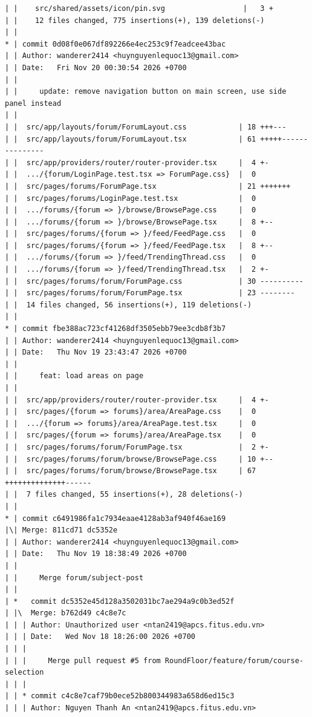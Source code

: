 \documentclass[12pt]{article}
\begin{document}
\begin{lstlisting}[numbers=none,breaklines=true]
| |    src/shared/assets/icon/pin.svg                  |   3 +
| |    12 files changed, 775 insertions(+), 139 deletions(-)
| |
* | commit 0d08f0e067df892266e4ec253c9f7eadcee43bac
| | Author: wanderer2414 <huynguyenlequoc13@gmail.com>
| | Date:   Fri Nov 20 00:30:54 2026 +0700
| |
| |     update: remove navigation button on main screen, use side panel instead
| |
| |  src/app/layouts/forum/ForumLayout.css            | 18 +++---
| |  src/app/layouts/forum/ForumLayout.tsx            | 61 +++++---------------
| |  src/app/providers/router/router-provider.tsx     |  4 +-
| |  .../{forum/LoginPage.test.tsx => ForumPage.css}  |  0
| |  src/pages/forums/ForumPage.tsx                   | 21 +++++++
| |  src/pages/forums/LoginPage.test.tsx              |  0
| |  .../forums/{forum => }/browse/BrowsePage.css     |  0
| |  .../forums/{forum => }/browse/BrowsePage.tsx     |  8 +--
| |  src/pages/forums/{forum => }/feed/FeedPage.css   |  0
| |  src/pages/forums/{forum => }/feed/FeedPage.tsx   |  8 +--
| |  .../forums/{forum => }/feed/TrendingThread.css   |  0
| |  .../forums/{forum => }/feed/TrendingThread.tsx   |  2 +-
| |  src/pages/forums/forum/ForumPage.css             | 30 ----------
| |  src/pages/forums/forum/ForumPage.tsx             | 23 --------
| |  14 files changed, 56 insertions(+), 119 deletions(-)
| |
* | commit fbe388ac723cf41268df3505ebb79ee3cdb8f3b7
| | Author: wanderer2414 <huynguyenlequoc13@gmail.com>
| | Date:   Thu Nov 19 23:43:47 2026 +0700
| |
| |     feat: load areas on page
| |
| |  src/app/providers/router/router-provider.tsx     |  4 +-
| |  src/pages/{forum => forums}/area/AreaPage.css    |  0
| |  .../{forum => forums}/area/AreaPage.test.tsx     |  0
| |  src/pages/{forum => forums}/area/AreaPage.tsx    |  0
| |  src/pages/forums/forum/ForumPage.tsx             |  2 +-
| |  src/pages/forums/forum/browse/BrowsePage.css     | 10 +--
| |  src/pages/forums/forum/browse/BrowsePage.tsx     | 67 ++++++++++++++------
| |  7 files changed, 55 insertions(+), 28 deletions(-)
| |
* | commit c6491986fa1c7934eaae4128ab3af940f46ae169
|\| Merge: 811cd71 dc5352e
| | Author: wanderer2414 <huynguyenlequoc13@gmail.com>
| | Date:   Thu Nov 19 18:38:49 2026 +0700
| |
| |     Merge forum/subject-post
| |
| *   commit dc5352e45d128a3502031bc7ae294a9c0b3ed52f
| |\  Merge: b762d49 c4c8e7c
| | | Author: Unauthorized user <ntan2419@apcs.fitus.edu.vn>
| | | Date:   Wed Nov 18 18:26:00 2026 +0700
| | |
| | |     Merge pull request #5 from RoundFloor/feature/forum/course-selection
| | |
| | * commit c4c8e7caf79b0ece52b800344983a658d6ed15c3
| | | Author: Nguyen Thanh An <ntan2419@apcs.fitus.edu.vn>

\end{lstlisting}
\end{document}
